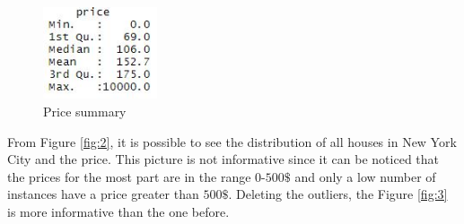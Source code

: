 \documentclass{FR16}
\begin{document}
\\
\begin{figure}[H]
\centering
\includegraphics[width=0.3\textwidth]{figures/figure1.jpg} 
\caption{\label{fig:1}Price summary}
\end{figure}
\noindent From Figure \ref{fig:2}, it is possible to see the distribution of all houses in New York City and the price. This picture is not  informative since it can be noticed that the prices for the most part are in the range $0$-$500\$$ and only a low number of instances have a price greater than $500\$$. Deleting the outliers, the Figure \ref{fig:3} is more informative than the one before.
\end{document}
